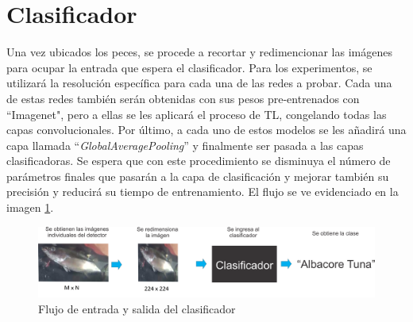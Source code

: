 \section{Clasificador}
Una vez ubicados los peces, se procede a recortar y redimencionar las imágenes para ocupar la entrada que espera el clasificador. Para los experimentos, se utilizará la resolución específica para cada una de las redes a probar. Cada una de estas redes también serán obtenidas con sus pesos pre-entrenados con ``Imagenet", pero a ellas se les aplicará el proceso de TL, congelando todas las capas convolucionales. Por último, a cada uno de estos modelos se les añadirá una capa llamada ``\textit{GlobalAveragePooling}'' y finalmente ser pasada a las capas clasificadoras. Se espera que con este procedimiento se disminuya el número de parámetros finales que pasarán a la capa de clasificación y mejorar también su precisión y reducirá su tiempo de entrenamiento. El flujo se ve evidenciado en la imagen \ref{fig:clasificador_pez}.
\begin{figure}[h!]
\includegraphics[width=1\textwidth]{images/clasificador_label.png}
\caption{Flujo de entrada y salida del clasificador }
\label{fig:clasificador_pez}
\end{figure}


